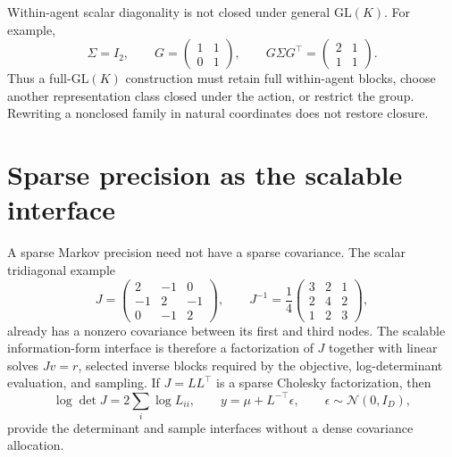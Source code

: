 Within-agent scalar diagonality is not closed under general $\mathrm{GL}(K)$. For example,
\begin{equation}
\Sigma=I_2,
\qquad
G=\begin{pmatrix}1&1\\0&1\end{pmatrix},
\qquad
G\Sigma G^\top
=\begin{pmatrix}2&1\\1&1\end{pmatrix}.
\label{eq:diagonal-covariance-nonclosure-example}
\end{equation}
Thus a full-$\mathrm{GL}(K)$ construction must retain full within-agent blocks, choose another representation class closed under the action, or restrict the group. Rewriting a nonclosed family in natural coordinates does not restore closure.

\section{Sparse precision as the scalable interface}

A sparse Markov precision need not have a sparse covariance.  The scalar tridiagonal example
\begin{equation}
J=\begin{pmatrix}
2&-1&0\\
-1&2&-1\\
0&-1&2
\end{pmatrix},
\qquad
J^{-1}=\frac14\begin{pmatrix}
3&2&1\\
2&4&2\\
1&2&3
\end{pmatrix},
\label{eq:tridiagonal-precision-dense-covariance}
\end{equation}
already has a nonzero covariance between its first and third nodes.  The scalable information-form interface is therefore a factorization of $J$ together with linear solves $Jv=r$, selected inverse blocks required by the objective, log-determinant evaluation, and sampling.  If $J=LL^\top$ is a sparse Cholesky factorization, then
\begin{equation}
\log\det J=2\sum_i\log L_{ii},
\qquad
y=\mu+L^{-\top}\epsilon,
\qquad
\epsilon\sim\mathcal N(0,I_D),
\label{eq:sparse-factor-logdet-sampling}
\end{equation}
provide the determinant and sample interfaces without a dense covariance allocation.

